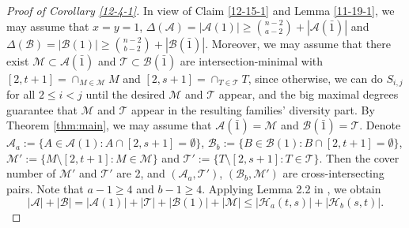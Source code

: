 \documentclass[11pt]{article}
\begin{document}
 


\begin{proof}[Proof of Corollary \ref{12-4-1}]
In view of Claim \ref{12-15-1} and Lemma \ref{11-19-1}, we may assume that  $x=y=1$, $\Delta(\mathcal{A})=|\mathcal{A}(1)|\ge {n-2\choose a-2}+|\mathcal{A}(\bar{1})|$ and  $\Delta(\mathcal{B})=|\mathcal{B}(1)|\ge {n-2\choose b-2}+|\mathcal{B}(\bar{1})|$. Moreover, we may assume that there exist $\mathcal{M}\subset \mathcal{A}(\bar{1})$ and $\mathcal{T}\subset \mathcal{B}(\bar{1})$ are intersection-minimal with $[2,t+1]=\cap_{M\in \mathcal{M}}M$ and $[2,s+1]=\cap_{T\in \mathcal{T}}T$, since otherwise, we can do $S_{i,j}$ for all $2\le i <j$ until the desired $\mathcal{M}$ and $\mathcal{T}$ appear, and the big maximal degrees guarantee that $\mathcal{M}$ and $\mathcal{T}$ appear in the resulting families' diversity part. By Theorem \ref{thm:main}, we may assume that $\mathcal{A}(\bar{1})=\mathcal{M}$ and $\mathcal{B}(\bar{1})=\mathcal{T}$. 
Denote $\mathcal{A}_a:=\{A\in \mathcal{A}(1): A\cap [2,s+1]=\emptyset\}$, $\mathcal{B}_b:=\{B\in \mathcal{B}(1): B\cap [2,t+1]=\emptyset\}$, $\mathcal{M}':=\{M\setminus [2,t+1]:M\in \mathcal{M}\}$ and $\mathcal{T}':=\{T\setminus [2,s+1]:T\in \mathcal{T}\}$. Then the cover number of $\mathcal{M}'$ and $\mathcal{T}'$ are 2, and $(\mathcal{A}_a, \mathcal{T}')$, $(\mathcal{B}_b, \mathcal{M}')$ are cross-intersecting pairs. 
Note that $a-1\ge 4$ and $b-1\ge 4$. Applying Lemma 2.2 in \cite{kup2018}, we obtain 
$$|\mathcal{A}|+|\mathcal{B}|=|\mathcal{A}(1)|+|\mathcal{T}|+|\mathcal{B}(1)|+|\mathcal{M}|\le |\mathcal{H}_a(t,s)|+|\mathcal{H}_b(s,t)|.$$
\end{proof}

\fi
\end{document}
